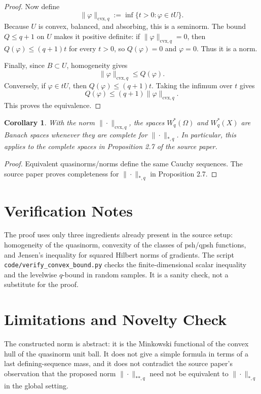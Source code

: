 \documentclass[11pt]{article}
\newtheorem{corollary}{Corollary}
\begin{document}
\begin{proof}
Now define
\[
  \|\varphi\|_{\mathrm{cvx},q}
  :=\inf\{t>0:\varphi\in tU\}.
\]
Because \(U\) is convex, balanced, and absorbing, this is a seminorm. The
bound \(Q\leq q+1\) on \(U\) makes it positive definite: if
\(\|\varphi\|_{\mathrm{cvx},q}=0\), then \(Q(\varphi)\leq(q+1)t\) for every
\(t>0\), so \(Q(\varphi)=0\) and \(\varphi=0\). Thus it is a norm.

Finally, since \(B\subset U\), homogeneity gives
\[
  \|\varphi\|_{\mathrm{cvx},q}\leq Q(\varphi).
\]
Conversely, if \(\varphi\in tU\), then \(Q(\varphi)\leq(q+1)t\). Taking the
infimum over \(t\) gives
\[
  Q(\varphi)\leq(q+1)\|\varphi\|_{\mathrm{cvx},q}.
\]
This proves the equivalence.
\end{proof}

\begin{corollary}
With the norm \(\|\cdot\|_{\mathrm{cvx},q}\), the spaces \(W_q^*(\Omega)\)
and \(W_q^*(X)\) are Banach spaces whenever they are complete for
\(\|\cdot\|_{*,q}\). In particular, this applies to the complete spaces in
Proposition 2.7 of the source paper.
\end{corollary}

\begin{proof}
Equivalent quasinorms/norms define the same Cauchy sequences. The source
paper proves completeness for \(\|\cdot\|_{*,q}\) in Proposition 2.7.
\end{proof}

\section*{Verification Notes}

The proof uses only three ingredients already present in the source setup:
homogeneity of the quasinorm, convexity of the classes of psh/qpsh functions,
and Jensen's inequality for squared Hilbert norms of gradients. The script
\texttt{code/verify\_convex\_bound.py} checks the finite-dimensional scalar
inequality and the levelwise \(q\)-bound in random samples. It is a sanity
check, not a substitute for the proof.

\section*{Limitations and Novelty Check}

The constructed norm is abstract: it is the Minkowski functional of the
convex hull of the quasinorm unit ball. It does not give a simple formula in
terms of a last defining-sequence mass, and it does not contradict the source
paper's observation that the proposed norm \(\|\cdot\|_{**,q}\) need not be
equivalent to \(\|\cdot\|_{*,q}\) in the global setting.
\end{document}
